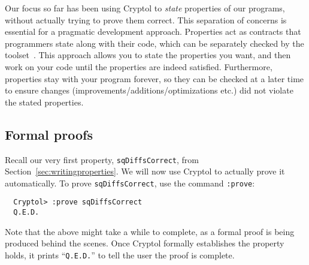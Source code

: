 
Our focus so far has been using Cryptol to \emph{state} properties of
our programs, without actually trying to prove them correct. This
separation of concerns is essential for a pragmatic development
approach.  Properties act as contracts that programmers state along
with their code, which can be separately checked by the
toolset~\cite{erkok-matthews-cryptolEqChecking-09}.  This approach
allows you to state the properties you want, and then work on your
code until the properties are indeed satisfied. Furthermore,
properties stay with your program forever, so they can be checked at a
later time to ensure changes (improvements/additions/optimizations
etc.) did not violate the stated properties.

\subsection{Formal proofs}
\label{sec:formal-proofs}

Recall our very first property, {\tt sqDiffsCorrect}, from
Section~\ref{sec:writingproperties}. We will now use Cryptol to
actually prove it automatically.  To prove {\tt sqDiffsCorrect}, use
the command {\tt :prove}:\indCmdProve
\begin{Verbatim}
  Cryptol> :prove sqDiffsCorrect
  Q.E.D.
\end{Verbatim}
Note that the above might take a while to complete, as a formal proof
is being produced behind the scenes.  Once Cryptol formally
establishes the property holds, it prints ``{\tt Q.E.D.}'' to tell the
user the proof is complete.\indQED\indProve

